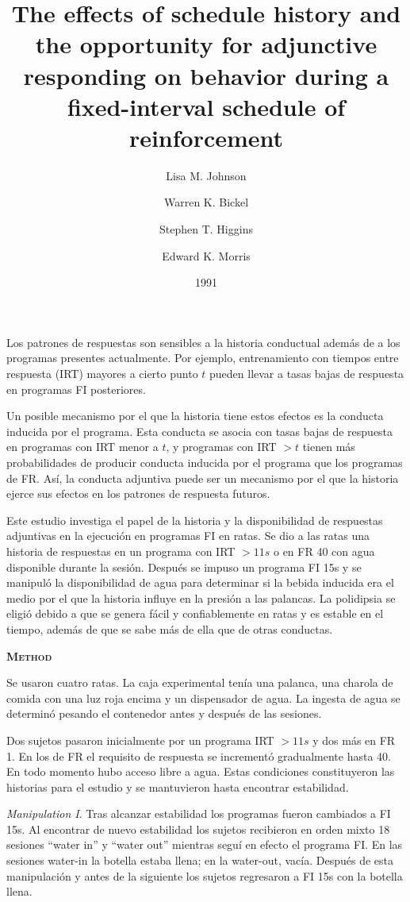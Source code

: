 \documentclass[a4paper,12pt]{article}
\title{The effects of schedule history and the opportunity for adjunctive responding on behavior during a fixed-interval schedule of reinforcement}
\author{Lisa M. Johnson \and Warren K. Bickel \and Stephen T. Higgins \and Edward K. Morris}
\date{1991}
\begin{document}
{\scshape\bfseries \maketitle}

Los patrones de respuestas son sensibles a la historia conductual además de a los programas presentes actualmente. Por ejemplo, entrenamiento con tiempos entre respuesta (IRT) mayores a cierto punto $t$ pueden llevar a tasas bajas de respuesta en programas FI posteriores.

Un posible mecanismo por el que la historia tiene estos efectos es la conducta inducida por el programa. Esta conducta se asocia con tasas bajas de respuesta en programas con IRT menor a $t$, y programas con IRT $> t$ tienen más probabilidades de producir conducta inducida por el programa que los programas de FR. Así, la conducta adjuntiva puede ser un mecanismo por el que la historia ejerce sus efectos en los patrones de respuesta futuros.

Este estudio investiga el papel de la historia y la disponibilidad de respuestas adjuntivas en la ejecución en programas FI en ratas. Se dio a las ratas una historia de respuestas en un programa con IRT $> 11s$ o en FR 40 con agua disponible durante la sesión. Después se impuso un programa FI 15s y se manipuló la disponibilidad de agua para determinar si la bebida inducida era el medio por el que la historia influye en la presión a las palancas. La polidipsia se eligió debido a que se genera fácil y confiablemente en ratas y es estable en el tiempo, además de que se sabe más de ella que de otras conductas.

{\scshape\bfseries Method}

Se usaron cuatro ratas. La caja experimental tenía una palanca, una charola de comida con una luz roja encima y un dispensador de agua. La ingesta de agua se determinó pesando el contenedor antes y después de las sesiones.

Dos sujetos pasaron inicialmente por un programa IRT $> 11s$ y dos más en FR 1. En los de FR el requisito de respuesta se incrementó gradualmente hasta 40. En todo momento hubo acceso libre a agua. Estas condiciones constituyeron las historias para el estudio y se mantuvieron hasta encontrar estabilidad.

{\itshape Manipulation I}. Tras alcanzar estabilidad los programas fueron cambiados a FI 15s. Al encontrar de nuevo estabilidad los sujetos recibieron en orden mixto 18 sesiones ``water in'' y ``water out'' mientras seguí en efecto el programa FI. En las sesiones water-in la botella estaba llena; en la water-out, vacía. Después de esta manipulación y antes de la siguiente los sujetos regresaron a FI 15s con la botella llena.
\end{document}
